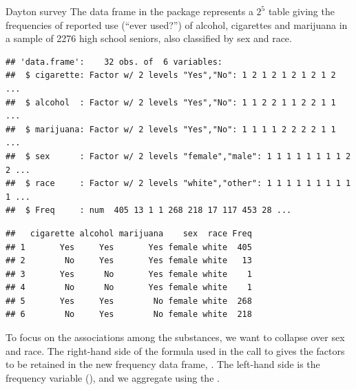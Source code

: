 \documentclass[11pt]{book}
\renewenvironment{knitrout}{\small\renewcommand{\baselinestretch}{.85}}{} %
\begin{document}
\begin{Example}[dayton1]{Dayton survey}
The data frame  in the  package represents a
$2^5$ table giving the frequencies of reported use (``ever used?'') of 
alcohol, cigarettes and marijuana in a sample of 2276 high school seniors,
also classified by sex and race.  

\begin{knitrout}
\color{fgcolor}\begin{kframe}
\begin{alltt}
 \hlstd{=}\hlstd{)}
\end{alltt}
\begin{verbatim}
## 'data.frame':	32 obs. of  6 variables:
##  $ cigarette: Factor w/ 2 levels "Yes","No": 1 2 1 2 1 2 1 2 1 2 ...
##  $ alcohol  : Factor w/ 2 levels "Yes","No": 1 1 2 2 1 1 2 2 1 1 ...
##  $ marijuana: Factor w/ 2 levels "Yes","No": 1 1 1 1 2 2 2 2 1 1 ...
##  $ sex      : Factor w/ 2 levels "female","male": 1 1 1 1 1 1 1 1 2 2 ...
##  $ race     : Factor w/ 2 levels "white","other": 1 1 1 1 1 1 1 1 1 1 ...
##  $ Freq     : num  405 13 1 1 268 218 17 117 453 28 ...
\end{verbatim}
\begin{alltt}
\end{alltt}
\begin{verbatim}
##   cigarette alcohol marijuana    sex  race Freq
## 1       Yes     Yes       Yes female white  405
## 2        No     Yes       Yes female white   13
## 3       Yes      No       Yes female white    1
## 4        No      No       Yes female white    1
## 5       Yes     Yes        No female white  268
## 6        No     Yes        No female white  218
\end{verbatim}
\end{kframe}
\end{knitrout}

To focus on the associations among the
substances, we want to collapse over sex and race. The right-hand side of the formula
used in the call to  gives the factors to be retained in the
new frequency data frame, .  The left-hand side is
the frequency variable (), and we aggregate using the .


\end{Example}
\end{document}
